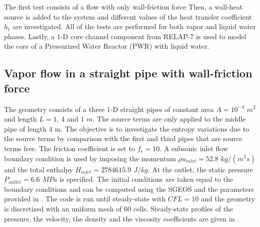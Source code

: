 %
The first test consists of a flow with only wall-friction force Then, a wall-heat source is added to the system and different values of the heat transfer coefficient $h_t$ are investigated. All of the tests are performed for both vapor and liquid water phases. Lastly, a $1$-D core channel component from RELAP-7 is used to model the core of a Pressurized Water Reactor (PWR) with liquid water.
\subsection{Vapor flow in a straight pipe with wall-friction force} \label{sec:1d-wall-fricition-vapor}
The geometry consists of a three $1$-D straight pipes of constant area $A= 10^{-4}$ $m^2$ and length $L=1$, $4$ and $1$ $m$. The source terms are only applied to the middle pipe of length $4$ m. The objective is to investigate the entropy variations due to the source terms by comparison with the first and third pipes that are source terms free. The friction coefficient is set to $f_c = 10$. A subsonic inlet flow boundary condition is used by imposing the momentum $\rho u_{inlet} = 52.8$ $kg/(m^2 s)$ and the total enthalpy $H_{inlet}=2784615.9$ $J / kg$. At the outlet, the static pressure $P_{outlet}=6.6$ $MPa$ is specified. The initial conditions are taken equal to the boundary conditions and can be computed using the SGEOS and the parameters provided in . The code is run until steady-state with $CFL=10$ and the geometry is discretized with an uniform mesh of $60$ cells. Steady-state profiles of the pressure, the velocity, the density and the viscosity coefficients are given in .
%
